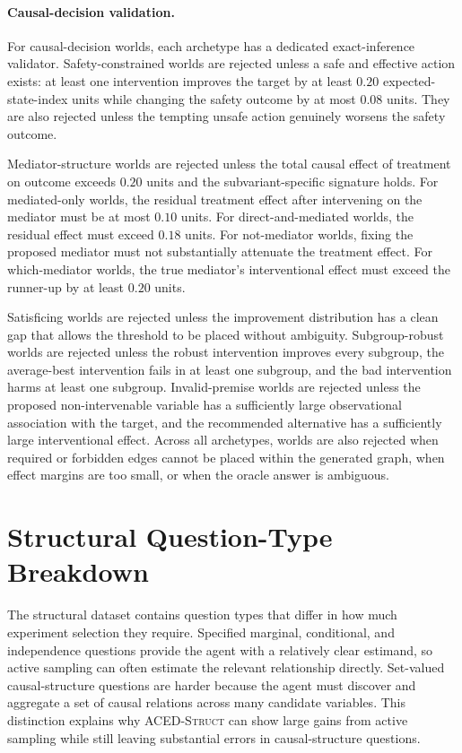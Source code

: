 \documentclass{article}
\newcommand{\pgmstruct}{\textsc{ACED-Struct} }
\begin{document}
\paragraph{Causal-decision validation.}
For causal-decision worlds, each archetype has a dedicated exact-inference validator.
Safety-constrained worlds are rejected unless a safe and effective action exists: at least one intervention improves the target by at least $0.20$ expected-state-index units while changing the safety outcome by at most $0.08$ units.
They are also rejected unless the tempting unsafe action genuinely worsens the safety outcome.

Mediator-structure worlds are rejected unless the total causal effect of treatment on outcome exceeds $0.20$ units and the subvariant-specific signature holds.
For mediated-only worlds, the residual treatment effect after intervening on the mediator must be at most $0.10$ units.
For direct-and-mediated worlds, the residual effect must exceed $0.18$ units.
For not-mediator worlds, fixing the proposed mediator must not substantially attenuate the treatment effect.
For which-mediator worlds, the true mediator's interventional effect must exceed the runner-up by at least $0.20$ units.

Satisficing worlds are rejected unless the improvement distribution has a clean gap that allows the threshold to be placed without ambiguity.
Subgroup-robust worlds are rejected unless the robust intervention improves every subgroup, the average-best intervention fails in at least one subgroup, and the bad intervention harms at least one subgroup.
Invalid-premise worlds are rejected unless the proposed non-intervenable variable has a sufficiently large observational association with the target, and the recommended alternative has a sufficiently large interventional effect.
Across all archetypes, worlds are also rejected when required or forbidden edges cannot be placed within the generated graph, when effect margins are too small, or when the oracle answer is ambiguous.

\section{Structural Question-Type Breakdown}
\label{app:structural_qtype_breakdown}

The structural dataset contains question types that differ in how much experiment selection they require.
Specified marginal, conditional, and independence questions provide the agent with a relatively clear estimand, so active sampling can often estimate the relevant relationship directly.
Set-valued causal-structure questions are harder because the agent must discover and aggregate a set of causal relations across many candidate variables.
This distinction explains why \pgmstruct can show large gains from active sampling while still leaving substantial errors in causal-structure questions.
\end{document}
